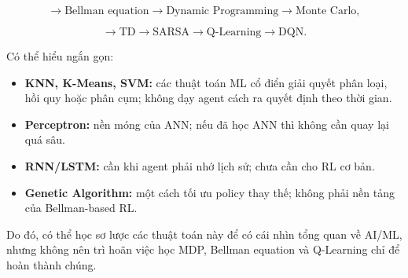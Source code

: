 \documentclass[12pt,a4paper]{report}
\begin{document}
\begin{equation}
\rightarrow
\text{Bellman equation}
\rightarrow
\text{Dynamic Programming}
\rightarrow
\text{Monte Carlo},
\end{equation}

\begin{equation}
\rightarrow
\text{TD}
\rightarrow
\text{SARSA}
\rightarrow
\text{Q-Learning}
\rightarrow
\text{DQN}.
\end{equation}

Có thể hiểu ngắn gọn:

\begin{itemize}[leftmargin=1.5em]
    \item \textbf{KNN, K-Means, SVM:} các thuật toán ML cổ điển giải quyết phân loại, hồi quy hoặc phân cụm; không dạy agent cách ra quyết định theo thời gian.
    \item \textbf{Perceptron:} nền móng của ANN; nếu đã học ANN thì không cần quay lại quá sâu.
    \item \textbf{RNN/LSTM:} cần khi agent phải nhớ lịch sử; chưa cần cho RL cơ bản.
    \item \textbf{Genetic Algorithm:} một cách tối ưu policy thay thế; không phải nền tảng của Bellman-based RL.
\end{itemize}

Do đó, có thể học sơ lược các thuật toán này để có cái nhìn tổng quan về AI/ML, nhưng không nên trì hoãn việc học MDP, Bellman equation và Q-Learning chỉ để hoàn thành chúng.
\end{document}

